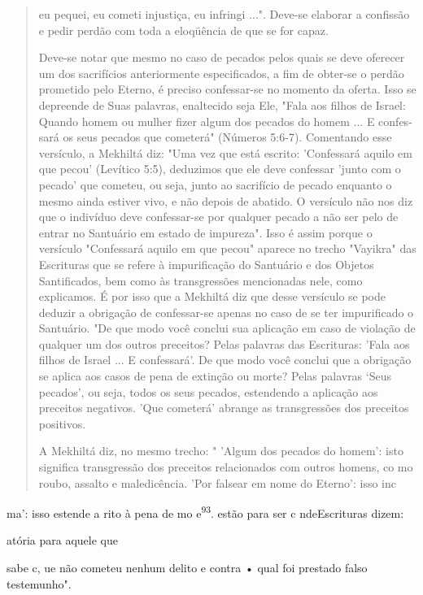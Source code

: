 \begin{quote}


eu pequei, eu cometi injustiça, eu infringi ...". Deve-se elaborar a
confissão e pedir perdão com toda a eloqüência de que se for capaz.

Deve-se notar que mesmo no caso de pecados pelos quais se deve oferecer
um dos sacrifícios anteriormente especificados, a fim de obter-se o
per­dão prometido pelo Eterno, é preciso confessar-se no momento da
oferta. Isso se depreende de Suas palavras, enaltecido seja Ele, "Fala
aos filhos de Israel: Quando homem ou mulher fizer algum dos pecados do
homem ... E confes­sará os seus pecados que cometerá" (Números 5:6-7).
Comentando esse versí­culo, a Mekhiltá diz: "Uma vez que está escrito:
'Confessará aquilo em que pe­cou' (Levítico 5:5), deduzimos que ele deve
confessar 'junto com o pecado' que cometeu, ou seja, junto ao sacrifício
de pecado enquanto o mesmo ainda estiver vivo, e não depois de abatido.
O versículo não nos diz que o indivíduo deve confessar-se por qualquer
pecado a não ser pelo de entrar no Santuário em estado de impureza".
Isso é assim porque o versículo "Confessará aquilo em que pecou" aparece
no trecho "Vayikra" das Escrituras que se refere à im­purificação do
Santuário e dos Objetos Santificados, bem como às transgres­sões
mencionadas nele, como explicamos. É por isso que a Mekhiltá diz que
desse versículo se pode deduzir a obrigação de confessar-se apenas no
caso de se ter impurificado o Santuário. "De que modo você conclui sua
aplicação em caso de violação de qualquer um dos outros preceitos? Pelas
palavras das Escri­turas: 'Fala aos filhos de Israel ... E confessará'.
De que modo você conclui que a obrigação se aplica aos casos de pena de
extinção ou morte? Pelas palavras `Seus pecados', ou seja, todos os seus
pecados, estendendo a aplicação aos preceitos negativos. 'Que cometerá'
abrange as transgressões dos preceitos positivos.

A Mekhiltá diz, no mesmo trecho: " 'Algum dos pecados do homem': isto
significa transgressão dos preceitos relacionados com outros homens, co
mo roubo, assalto e maledicência. 'Por falsear em nome do Eterno': isso
inc
\end{quote}

ma': isso estende a ri­to à pena de mo e\textsuperscript{93}. estão para
ser c nde­Escrituras dizem:

atória para aquele que

sabe c, ue não cometeu nenhum delito e contra • qual foi prestado falso
testemunho".

